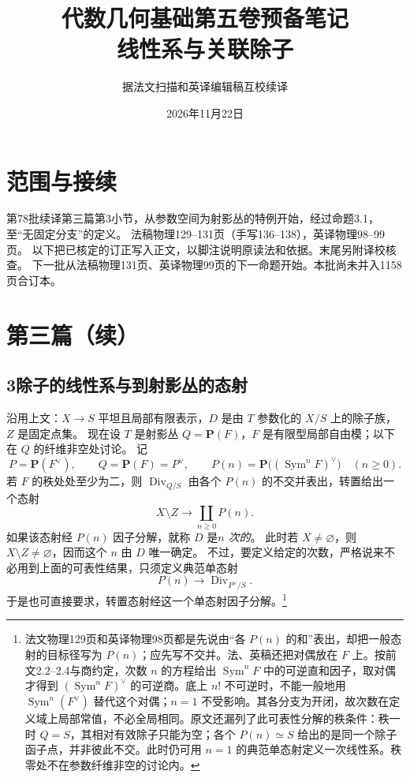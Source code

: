 \documentclass[openany,fontset=fandol]{ctexbook}
\DeclareMathOperator{\Div}{Div}
\newcommand{\PP}{\mathbf P}
\begin{document}
\title{代数几何基础第五卷预备笔记\\线性系与关联除子}
\author{据法文扫描和英译编辑稿互校续译}
\date{2026年11月22日}
\maketitle
\chapter*{范围与接续}
第78批续译第三篇第3小节，从参数空间为射影丛的特例开始，经过命题3.1，至“无固定分支”的定义。
法稿物理129--131页（手写136--138），英译物理98--99页。
以下把已核定的订正写入正文，以脚注说明原读法和依据。末尾另附译校核查。
下一批从法稿物理131页、英译物理99页的下一命题开始。本批尚未并入1158页合订本。
\chapter*{第三篇（续）}
\section*{3\quad 除子的线性系与到射影丛的态射}

沿用上文：\(X\to S\) 平坦且局部有限表示，\(D\) 是由 \(T\) 参数化的 \(X/S\) 上的除子族，\(Z\) 是固定点集。
现在设 \(T\) 是射影丛 \(Q=\PP(F)\)，\(F\) 是有限型局部自由模；以下在 \(Q\) 的纤维非空处讨论。
记
\[
 P=\PP(F^\vee),\qquad Q=\PP(F)=P^\vee,\qquad
 P(n)=\PP\bigl((\operatorname{Sym}^n F)^\vee\bigr)\quad(n\geq0).
\]
若 \(F\) 的秩处处至少为二，则 \(\Div_{Q/S}\) 由各个 \(P(n)\) 的不交并表出，转置给出一个态射
\[
 X\setminus Z\longrightarrow\coprod_{n\geq0}P(n).
\]
如果该态射经 \(P(n)\) 因子分解，就称 \(D\) 是\emph{\(n\) 次的}。
此时若 \(X\ne\varnothing\)，则 \(X\setminus Z\ne\varnothing\)，因而这个 \(n\) 由 \(D\) 唯一确定。
不过，要定义给定的次数，严格说来不必用到上面的可表性结果，只须定义典范单态射
\[
 P(n)\longrightarrow\Div_{P^\vee/S}.
\]
于是也可直接要求，转置态射经这一个单态射因子分解。\footnote{法文物理129页和英译物理98页都是先说由“各 \(P(n)\) 的和”表出，却把一般态射的目标径写为 \(P(n)\)；应先写不交并。法、英稿还把对偶放在 \(F\) 上。按前文2.2--2.4与商约定，次数 \(n\) 的方程给出 \(\operatorname{Sym}^n F\) 中的可逆直和因子，取对偶才得到 \((\operatorname{Sym}^n F)^\vee\) 的可逆商。底上 \(n!\) 不可逆时，不能一般地用 \(\operatorname{Sym}^n(F^\vee)\) 替代这个对偶；\(n=1\) 不受影响。其各分支为开闭，故次数在定义域上局部常值，不必全局相同。原文还漏列了此可表性分解的秩条件：秩一时 \(Q=S\)，其相对有效除子只能为空；各个 \(P(n)\simeq S\) 给出的是同一个除子函子点，并非彼此不交。此时仍可用 \(n=1\) 的典范单态射定义一次线性系。秩零处不在参数纤维非空的讨论内。}
\end{document}
